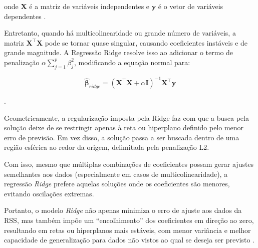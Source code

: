 \noindent onde $\mathbf{X}$ é a matriz de variáveis independentes e $\mathbf{y}$ é o vetor de variáveis dependentes \cite{montgomery2012}.

Entretanto, quando há multicolinearidade ou grande número de variáveis, a matriz $\mathbf{X}^\top \mathbf{X}$  pode se tornar quase singular, causando coeficientes instáveis e de grande magnitude. A Regressão Ridge resolve isso ao adicionar o termo de penalização $\alpha \sum_{j=1}^{p}\beta_{j}^2$, modificando a equação normal para:

\begin{equation}
	\hat{\boldsymbol\beta}_{ridge} = (\mathbf{X}^\top \mathbf{X} + \alpha \mathbf{I})^{-1} \mathbf{X}^\top \mathbf{y}
\end{equation}

\noindent \cite{ScikitLearnRidge2025}.

Geometricamente, a regularização imposta pela Ridge faz com que a busca pela solução deixe de se restringir apenas à reta ou hiperplano definido pelo menor erro de previsão. Em vez disso, a solução passa a ser buscada dentro de uma região esférica ao redor da origem, delimitada pela penalização L2.

Com isso, mesmo que múltiplas combinações de coeficientes possam gerar ajustes semelhantes aos dados (especialmente em casos de multicolinearidade), a regressão \textit{Ridge} prefere aquelas soluções onde os coeficientes são menores, evitando oscilações extremas.

Portanto, o modelo \textit{Ridge} não apenas minimiza o erro de ajuste aos dados da \gls{RSS}, mas também impõe um “encolhimento” dos coeficientes em direção ao zero, resultando em retas ou hiperplanos mais estáveis, com menor variância e melhor capacidade de generalização para dados não vistos ao qual se deseja ser previsto \cite{McDonald:2009:RR}.